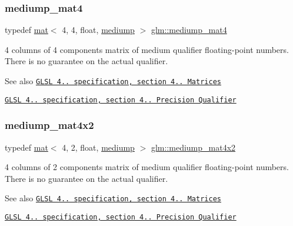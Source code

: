 \subsubsection{\texorpdfstring{mediump\+\_\+mat4}{mediump\_mat4}}
{\footnotesize\ttfamily typedef \mbox{\hyperlink{structglm_1_1mat}{mat}}$<$ 4, 4, float, \mbox{\hyperlink{namespaceglm_a36ed105b07c7746804d7fdc7cc90ff25a6416f3ea0c9025fb21ed50c4d6620482}{mediump}} $>$ \mbox{\hyperlink{group__core__precision_ga0987ea03f27d035ebd79fd71ca394be1}{glm\+::mediump\+\_\+mat4}}}

4 columns of 4 components matrix of medium qualifier floating-\/point numbers. There is no guarantee on the actual qualifier.

\begin{DoxySeeAlso}{See also}
\href{http://www.opengl.org/registry/doc/GLSLangSpec.4.20.8.pdf}{\tt G\+L\+SL 4.. specification, section 4.. Matrices} 

\href{http://www.opengl.org/registry/doc/GLSLangSpec.4.20.8.pdf}{\tt G\+L\+SL 4.. specification, section 4.. Precision Qualifier} 
\end{DoxySeeAlso}
\mbox{\label{group__core__precision_gaf0c9bd4c952160fa6f63ae8ab243beea}} 
\subsubsection{\texorpdfstring{mediump\+\_\+mat4x2}{mediump\_mat4x2}}
{\footnotesize\ttfamily typedef \mbox{\hyperlink{structglm_1_1mat}{mat}}$<$ 4, 2, float, \mbox{\hyperlink{namespaceglm_a36ed105b07c7746804d7fdc7cc90ff25a6416f3ea0c9025fb21ed50c4d6620482}{mediump}} $>$ \mbox{\hyperlink{group__core__precision_gaf0c9bd4c952160fa6f63ae8ab243beea}{glm\+::mediump\+\_\+mat4x2}}}

4 columns of 2 components matrix of medium qualifier floating-\/point numbers. There is no guarantee on the actual qualifier.

\begin{DoxySeeAlso}{See also}
\href{http://www.opengl.org/registry/doc/GLSLangSpec.4.20.8.pdf}{\tt G\+L\+SL 4.. specification, section 4.. Matrices} 

\href{http://www.opengl.org/registry/doc/GLSLangSpec.4.20.8.pdf}{\tt G\+L\+SL 4.. specification, section 4.. Precision Qualifier} 
\end{DoxySeeAlso}
\mbox{\label{group__core__precision_ga2d5eb7a43e7564b4e048512b8488994a}} 
